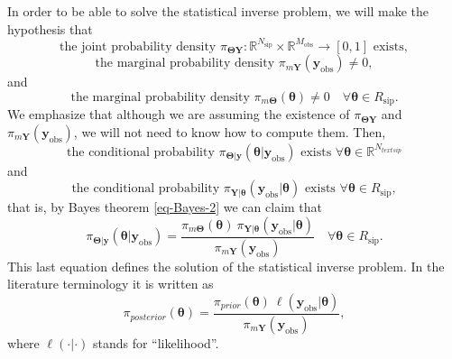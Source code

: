 In order to be able to solve the statistical inverse problem, we will make the hypothesis that
\begin{equation}\label{eq-hyp-jpd}
\text{the joint probability density }\pi_{\boldsymbol{\Theta}\mathbf{Y}}:\mathbb{R}^{N_{\text{sip}}}\times\mathbb{R}^{M_{\text{obs}}}\rightarrow [0,1]\text{ exists},
\end{equation}
\begin{equation}\label{eq-hyp-obs-mp}
\text{the marginal probability density }\pi_{m\mathbf{Y}}(\mathbf{y}_{\text{obs}})\neq 0,
\end{equation}
and
\begin{equation}\label{eq-hyp-theta-mp}
\text{the marginal probability density }\pi_{m\boldsymbol{\Theta}}(\boldsymbol{\theta})\neq 0\quad\forall\boldsymbol\theta\in R_{\text{sip}}.
\end{equation}
We emphasize that although we are assuming the existence of
$\pi_{\boldsymbol{\Theta}\mathbf{Y}}$ and
$\pi_{m\mathbf{Y}}(\mathbf{y}_{\text{obs}})$,
we will not need to know how to compute them.
Then,
\begin{equation*}
\text{the conditional probability }\pi_{\boldsymbol\Theta|\mathbf{y}}(\boldsymbol\theta|\mathbf{y}_{\text{obs}})\text{ exists }\forall\boldsymbol\theta\in\mathbb{R}^{N_{text{sip}}}
\end{equation*}
and
\begin{equation*}
\text{the conditional probability }\pi_{\mathbf{Y}|\boldsymbol\theta}(\mathbf{y}_{\text{obs}}|\boldsymbol\theta)\text{ exists }\forall\boldsymbol\theta\in R_{\text{sip}},
\end{equation*}
that is, by Bayes theorem \eqref{eq-Bayes-2} we can claim that
\begin{equation*}
\pi_{\boldsymbol\Theta|\mathbf{y}}(\boldsymbol\theta|\mathbf{y}_{\text{obs}})
=
\frac
{\pi_{m\boldsymbol{\Theta}}(\boldsymbol{\theta})~\pi_{\mathbf{Y}|\boldsymbol\theta}(\mathbf{y}_{\text{obs}}|\boldsymbol\theta)}
{\pi_{m\mathbf{Y}}(\mathbf{y}_{\text{obs}})}
\quad\forall\boldsymbol\theta\in R_{\text{sip}}.
\end{equation*}
This last equation defines the solution of the statistical inverse problem. In the literature terminology it is written as
\begin{equation}\label{eq-sol-sip}
\pi_{posterior}(\boldsymbol\theta)
=
\frac
{\pi_{prior}(\boldsymbol{\theta})~\ell(\mathbf{y}_{\text{obs}}|\boldsymbol\theta)}
{\pi_{m\mathbf{Y}}(\mathbf{y}_{\text{obs}})},
\end{equation}
where $\ell(\cdot|\cdot)$ stands for ``likelihood''.
